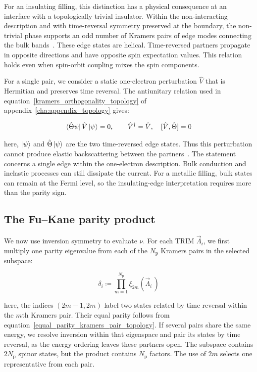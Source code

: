 For an insulating filling, this distinction has a physical consequence at an interface with a topologically trivial insulator.
Within the non-interacting description and with time-reversal symmetry preserved at the boundary,
the non-trivial phase supports an odd number of Kramers pairs of edge modes connecting the bulk bands~\cite{kane2005z2}.
These edge states are helical.
Time-reversed partners propagate in opposite directions and have opposite spin expectation values.
This relation holds even when spin-orbit coupling mixes the spin components.

For a single pair, we consider a static one-electron perturbation $\hat{V}$ that is Hermitian and preserves time reversal.
The antiunitary relation used in equation~\eqref{kramers_orthogonality_topology} of appendix~\ref{cha:appendix_topology} gives:

\begin{equation}
    \bra{\hat{\Theta}\psi}\hat{V}\ket{\psi}=0,
    \qquad
    \hat{V}^{\dagger}=\hat{V},\quad
    [\hat{V},\hat{\Theta}]=0
\label{helical_edge_backscattering_topology}
\end{equation}

here, $\ket{\psi}$ and $\hat{\Theta}\ket{\psi}$ are the two time-reversed edge states.
Thus this perturbation cannot produce elastic backscattering between the partners~\cite{kane2005z2}.
The statement concerns a single edge within the one-electron description.
Bulk conduction and inelastic processes can still dissipate the current.
For a metallic filling, bulk states can remain at the Fermi level,
so the insulating-edge interpretation requires more than the parity sign.

\FloatBarrier
\subsection{The Fu--Kane parity product}

We now use inversion symmetry to evaluate $\nu$.
For each TRIM $\vec{\Lambda}_i$, we first multiply one parity eigenvalue from each of the $N_\mathrm{p}$ Kramers pairs in the selected subspace:

\begin{equation}
    \delta_i
    \coloneqq\prod_{m=1}^{N_\mathrm{p}}\xi_{2m}(\vec{\Lambda}_i\,)
\label{parity_product_at_trim_topology}
\end{equation}

here, the indices $(2m-1,2m)$ label two states related by time reversal within the $m$th Kramers pair.
Their equal parity follows from equation~\eqref{equal_parity_kramers_pair_topology}.
If several pairs share the same energy, we resolve inversion within that eigenspace and pair its states by time reversal,
as the energy ordering leaves these partners open.
The subspace contains $2N_\mathrm{p}$ spinor states, but the product contains $N_\mathrm{p}$ factors.
The use of $2m$ selects one representative from each pair.

